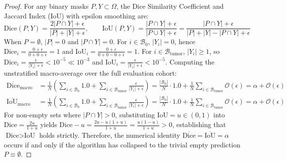 \documentclass{article}
\begin{document}
\begin{proof}
For any binary masks $P, Y \subset \Omega$, the Dice Similarity Coefficient and Jaccard Index (IoU) with epsilon smoothing are:
\begin{equation}
    \text{Dice}(P, Y) = \frac{2 |P \cap Y| + \epsilon}{|P| + |Y| + \epsilon}, \qquad \text{IoU}(P, Y) = \frac{|P \cap Y| + \epsilon}{|P \cup Y| + \epsilon} = \frac{|P \cap Y| + \epsilon}{|P| + |Y| - |P \cap Y| + \epsilon}
\end{equation}
When $P = \emptyset$, $|P| = 0$ and $|P \cap Y| = 0$. 
For $i \in \mathcal{B}_0$, $|Y_i| = 0$, hence $\text{Dice}_i = \frac{0 + \epsilon}{0 + 0 + \epsilon} = 1$ and $\text{IoU}_i = \frac{0 + \epsilon}{0 + 0 - 0 + \epsilon} = 1$.
For $i \in \mathcal{B}_{\text{tumor}}$, $|Y_i| \ge 1$, so $\text{Dice}_i = \frac{\epsilon}{|Y_i| + \epsilon} < 10^{-5} \ll 10^{-3}$ and $\text{IoU}_i = \frac{\epsilon}{|Y_i| + \epsilon} < 10^{-5}$.
Computing the unstratified macro-average over the full evaluation cohort:
\begin{align}
    \overline{\text{Dice}}_{\text{macro}} &= \frac{1}{N} \left( \sum_{i \in \mathcal{B}_0} 1.0 + \sum_{i \in \mathcal{B}_{\text{tumor}}} \frac{\epsilon}{|Y_i| + \epsilon} \right) = \frac{|\mathcal{B}_0|}{N} \cdot 1.0 + \frac{1}{N} \sum_{i \in \mathcal{B}_{\text{tumor}}} \mathcal{O}(\epsilon) = \alpha + \mathcal{O}(\epsilon) \\
    \overline{\text{IoU}}_{\text{macro}} &= \frac{1}{N} \left( \sum_{i \in \mathcal{B}_0} 1.0 + \sum_{i \in \mathcal{B}_{\text{tumor}}} \frac{\epsilon}{|Y_i| + \epsilon} \right) = \frac{|\mathcal{B}_0|}{N} \cdot 1.0 + \frac{1}{N} \sum_{i \in \mathcal{B}_{\text{tumor}}} \mathcal{O}(\epsilon) = \alpha + \mathcal{O}(\epsilon)
\end{align}
For non-empty sets where $|P \cap Y| > 0$, substituting $\text{IoU} = u \in (0, 1)$ into $\text{Dice} = \frac{2u}{1+u}$ yields $\text{Dice} - u = \frac{2u - u(1+u)}{1+u} = \frac{u(1-u)}{1+u} > 0$, establishing that $\text{Dice} > \text{IoU}$ holds strictly. Therefore, the numerical identity $\overline{\text{Dice}} = \overline{\text{IoU}} = \alpha$ occurs if and only if the algorithm has collapsed to the trivial empty prediction $P \equiv \emptyset$.
\end{proof}
\end{document}
